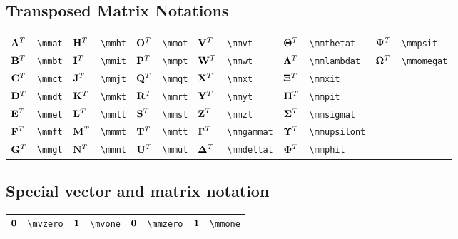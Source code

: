 \documentclass{article}
\begin{document}
\subsection{Transposed Matrix Notations}
\begin{longtable}{*{12}{l}}
${{\mathbf A}^T}$ & \lstinline`\mmat` & ${{\mathbf H}^T}$ & \lstinline`\mmht` & ${{\mathbf O}^T}$ & \lstinline`\mmot` & ${{\mathbf V}^T}$ & \lstinline`\mmvt` & ${{\bm \Theta}^T}$ & \lstinline`\mmthetat` & ${{\bm \Psi}^T}$ & \lstinline`\mmpsit`\\
${{\mathbf B}^T}$ & \lstinline`\mmbt` & ${{\mathbf I}^T}$ & \lstinline`\mmit` & ${{\mathbf P}^T}$ & \lstinline`\mmpt` & ${{\mathbf W}^T}$ & \lstinline`\mmwt` & ${{\bm \Lambda}^T}$ & \lstinline`\mmlambdat` & ${{\bm \Omega}^T}$ & \lstinline`\mmomegat`\\
${{\mathbf C}^T}$ & \lstinline`\mmct` & ${{\mathbf J}^T}$ & \lstinline`\mmjt` & ${{\mathbf Q}^T}$ & \lstinline`\mmqt` & ${{\mathbf X}^T}$ & \lstinline`\mmxt` & ${{\bm \Xi}^T}$ & \lstinline`\mmxit` & \\
${{\mathbf D}^T}$ & \lstinline`\mmdt` & ${{\mathbf K}^T}$ & \lstinline`\mmkt` & ${{\mathbf R}^T}$ & \lstinline`\mmrt` & ${{\mathbf Y}^T}$ & \lstinline`\mmyt` & ${{\bm \Pi}^T}$ & \lstinline`\mmpit` & \\
${{\mathbf E}^T}$ & \lstinline`\mmet` & ${{\mathbf L}^T}$ & \lstinline`\mmlt` & ${{\mathbf S}^T}$ & \lstinline`\mmst` & ${{\mathbf Z}^T}$ & \lstinline`\mmzt` & ${{\bm \Sigma}^T}$ & \lstinline`\mmsigmat` & \\
${{\mathbf F}^T}$ & \lstinline`\mmft` & ${{\mathbf M}^T}$ & \lstinline`\mmmt` & ${{\mathbf T}^T}$ & \lstinline`\mmtt` & ${{\bm \Gamma}^T}$ & \lstinline`\mmgammat` & ${{\bm \Upsilon}^T}$ & \lstinline`\mmupsilont` & \\
${{\mathbf G}^T}$ & \lstinline`\mmgt` & ${{\mathbf N}^T}$ & \lstinline`\mmnt` & ${{\mathbf U}^T}$ & \lstinline`\mmut` & ${{\bm \Delta}^T}$ & \lstinline`\mmdeltat` & ${{\bm \Phi}^T}$ & \lstinline`\mmphit` & \\
\end{longtable}

\subsection{Special vector and matrix notation}
\begin{longtable}{*{8}{l}}
${\bm 0}$ & \lstinline`\mvzero` & ${\bm 1}$ & \lstinline`\mvone` & ${\mathbf 0}$ & \lstinline`\mmzero` & ${\mathbf 1}$ & \lstinline`\mmone` \\
\end{longtable}
\end{document}
